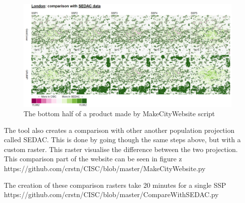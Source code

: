 \begin{figure} [H]
	\centering
	\includegraphics[width=.8\textwidth]{Pictures/MakeCityWebsite2}
	\caption{The bottom half of a product made by MakeCityWebsite script}
	\label{MakeCityWebsite1}
\end{figure}

The tool also creates a comparison with other another population projection called SEDAC. This is done by going though the same steps above, but with a custom raster. This raster visualise the difference between the two projection. This comparison part of the website can be seen in figure z
https://github.com/crstn/CISC/blob/master/MakeCityWebsite.py

The creation of these comparison rasters take 20 minutes for a single SSP
https://github.com/crstn/CISC/blob/master/CompareWithSEDAC.py




